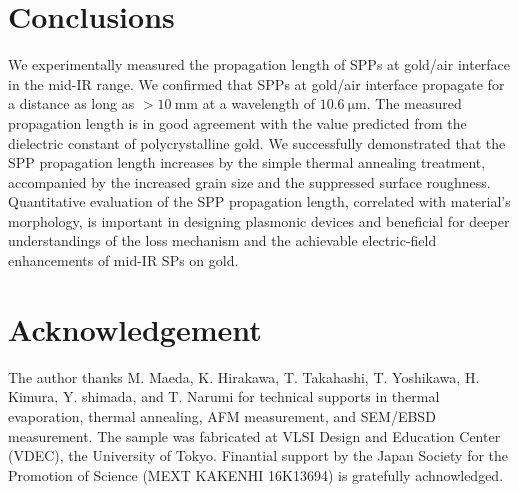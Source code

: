 \documentclass[aip,apl,reprint]{revtex4-1}
\begin{document}
\section{Conclusions}
\label{sec:conclusion}
We experimentally measured the propagation length of SPPs at gold/air interface in the mid-IR range. We confirmed that SPPs at gold/air interface propagate for a distance as long as $>10\:\mathrm{mm}$ at a wavelength of $10.6\:\mathrm{\mu m}$. The measured propagation length is in good agreement with the value predicted from the dielectric constant of polycrystalline gold. We successfully demonstrated that the SPP propagation length increases by the simple thermal annealing treatment, accompanied by the increased grain size and the suppressed surface roughness. Quantitative evaluation of the SPP propagation length, correlated with material's morphology, is important in designing plasmonic devices and beneficial for deeper understandings of the loss mechanism and the achievable electric-field enhancements of mid-IR SPs on gold.

\section*{Acknowledgement}
The author thanks M. Maeda, K. Hirakawa, T. Takahashi, T. Yoshikawa, H. Kimura, Y. shimada, and T. Narumi for technical supports in thermal evaporation, thermal annealing, AFM measurement, and SEM/EBSD measurement.
The sample was fabricated at VLSI Design and Education Center (VDEC), the University of Tokyo. Finantial support by the Japan Society for the Promotion of Science (MEXT KAKENHI 16K13694) is gratefully achnowledged.


\end{document}

